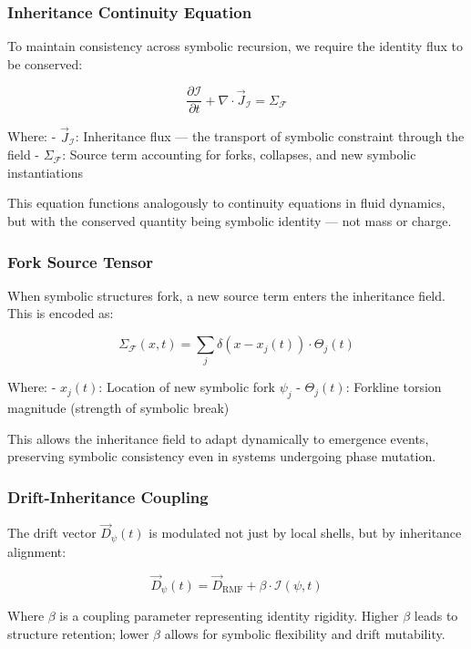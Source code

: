 \documentclass[12pt]{article}
\begin{document}
\subsubsection{Inheritance Continuity Equation}

To maintain consistency across symbolic recursion, we require the identity flux to be conserved:

\[
\frac{\partial \mathcal{I}}{\partial t} + \nabla \cdot \vec{J}_\mathcal{I} = \Sigma_\mathcal{F}
\]

Where:
- \( \vec{J}_\mathcal{I} \): Inheritance flux — the transport of symbolic constraint through the field
- \( \Sigma_\mathcal{F} \): Source term accounting for forks, collapses, and new symbolic instantiations

This equation functions analogously to continuity equations in fluid dynamics, but with the conserved quantity being symbolic identity — not mass or charge.

\subsubsection{Fork Source Tensor}

When symbolic structures fork, a new source term enters the inheritance field. This is encoded as:

\[
\Sigma_\mathcal{F}(x, t) = \sum_j \delta(x - x_j(t)) \cdot \Theta_j(t)
\]

Where:
- \( x_j(t) \): Location of new symbolic fork \( \psi_j \)
- \( \Theta_j(t) \): Forkline torsion magnitude (strength of symbolic break)

This allows the inheritance field to adapt dynamically to emergence events, preserving symbolic consistency even in systems undergoing phase mutation.

\subsubsection{Drift-Inheritance Coupling}

The drift vector \( \vec{D}_\psi(t) \) is modulated not just by local shells, but by inheritance alignment:

\[
\vec{D}_\psi(t) = \vec{D}_{\text{RMF}} + \beta \cdot \mathcal{I}(\psi, t)
\]

Where \( \beta \) is a coupling parameter representing identity rigidity. Higher \( \beta \) leads to structure retention; lower \( \beta \) allows for symbolic flexibility and drift mutability.
\end{document}
